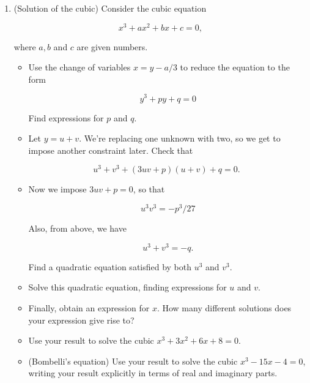 \documentclass[10pt]{amsart}
\theoremstyle{nonumberplain}
\begin{document}
\begin{enumerate}[label={\bf {\arabic*}:}]
\item (Solution of the cubic) Consider the cubic equation

$$
x^3+a x^2+b x+c=0,
$$

where $a, b$ and $c$ are given numbers.
\begin{itemize}
\item Use the change of variables $x=y-a / 3$ to reduce the equation to the form

$$
y^3+p y+q=0
$$


Find expressions for $p$ and $q$.
\item Let $y=u+v$. We're replacing one unknown with two, so we get to impose another constraint later. Check that

$$
u^3+v^3+(3 u v+p)(u+v)+q=0 \text {. }
$$

\item Now we impose $3 u v+p=0$, so that

$$
u^3 v^3=-p^3 / 27
$$

Also, from above, we have

$$
u^3+v^3=-q .
$$

Find a quadratic equation satisfied by both $u^3$ and $v^3$.
\item Solve this quadratic equation, finding expressions for $u$ and $v$.
\item Finally, obtain an expression for $x$. How many different solutions does your expression give rise to?
\item Use your result to solve the cubic $x^3+3 x^2+6 x+8=0$.
\item (Bombelli's equation) Use your result to solve the cubic $x^3-15
  x-4=0$, writing your result explicitly in terms of real and
  imaginary parts.
  \end{itemize}



\end{enumerate}
\end{document}
